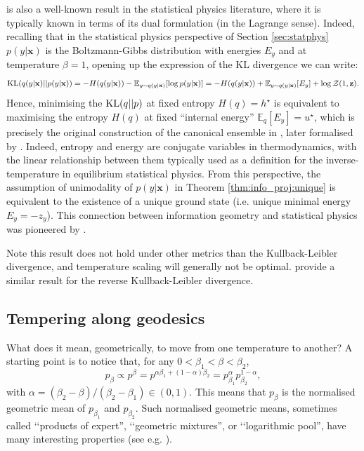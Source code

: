 \documentclass[10pt,dvipsnames]{article}
\newcommand{\bx}{\mathbf{x}}%
\newcommand{\bz}{\mathbf{z}}%
\theoremstyle{plain}
\theoremstyle{definition}
\theoremstyle{remark}
\begin{document}
 is also a well-known result in the statistical physics literature, where it is typically known in terms of its dual formulation (in the Lagrange sense). Indeed, recalling that in the statistical physics perspective of Section \ref{sec:statphys} $p(y|\bx)$ is the Boltzmann-Gibbs distribution with energies $E_y$ and at temperature $\beta=1$, opening up the expression of the KL divergence we can write:
\begin{align}
    \textup{KL} (q(y |\bx) || p(y |\bx))  = -H( q(y |\bx) )-\mathbb{E}_{y \sim q(y|\bx)}[\log p(y|\bx)] = -H(q(y |\bx))+\mathbb{E}_{y \sim q(y|\bx)}[ E_y ]+\log{\mathcal{Z}}(1,\bz).
\end{align}
Hence, minimising the $\textup{KL} (q || p)$ at fixed entropy $H(q)=h^{\star}$ is equivalent to maximising the entropy $H(q)$ at fixed ``internal energy'' $\mathbb{E}_{q}[E_{y}]=u^{\star}$, which is precisely the original construction of the canonical ensemble in \cite{boltzmann1885moglichkeit}, later formalised by \cite{gibbs1902elementary}. Indeed, entropy and energy are conjugate variables in thermodynamics, with the linear relationship between them typically used as a definition for the inverse-temperature in equilibrium statistical physics. From this perspective, the assumption of unimodality of $p(y|\bx)$ in Theorem \ref{thm:info_proj:unique} is equivalent to the existence of a unique ground state (i.e. unique minimal energy $E_{y}=-z_{y}$). This connection between information geometry and statistical physics was pioneered by \cite{jaynes1957information}.  

Note this result does not hold under other metrics than the Kullback-Leibler divergence, and temperature scaling will generally not be optimal. \citet[Proposition 4]{girardin2016escort} provide a similar result for the reverse Kullback-Leibler divergence.



\subsection{Tempering along geodesics}


What does it mean, geometrically, to move from one temperature to another? A starting point is to notice that, for any $0<\beta_1 < \beta < \beta_2$, 
\begin{equation}
    p_{\beta} \propto p^{\beta}= p^{\alpha \beta_1 + (1-\alpha) \beta_2}=p_{\beta_1} ^\alpha p_{\beta_2}  ^{1-\alpha},
\end{equation}
with $ \alpha = (\beta_2-\beta)/(\beta_2 - \beta_1) \in (0,1)$. This means that $p_{\beta}$ is the normalised geometric mean of  $p_{\beta_1}$ and $p_{\beta_2}$. Such normalised geometric means, sometimes called ‘‘products of expert'', ‘‘geometric mixtures'', or ‘‘logarithmic pool'', have many interesting properties (see e.g. \citealp{amari2007integration,carvalho2023,razafindralambo2026beyond}). 
\end{document}

